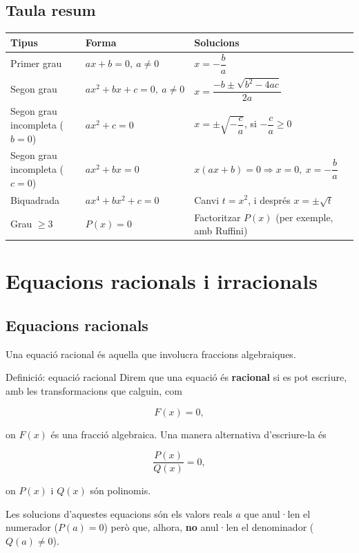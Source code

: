 \subsection{Taula resum}

\begin{center}
\begin{tabularx}{\linewidth}{lYY}
\toprule
\textbf{Tipus} & \textbf{Forma} & \textbf{Solucions} \\
\midrule
Primer grau & $ax+b=0,\ a\neq 0$ & $x=-\dfrac{b}{a}$ \\
Segon grau & $ax^2+bx+c=0,\ a\neq 0$ & $x=\dfrac{-b\pm\sqrt{b^2-4ac}}{2a}$ \\
Segon grau incompleta ($b=0$) & $ax^2+c=0$ & $x=\pm\sqrt{-\dfrac{c}{a}}$, si $-\dfrac{c}{a}\geq 0$ \\
Segon grau incompleta ($c=0$) & $ax^2+bx=0$ & $x(ax+b)=0 \Rightarrow x=0,\ x=-\dfrac{b}{a}$ \\
Biquadrada & $ax^4+bx^2+c=0$ & Canvi $t=x^2$, i després $x=\pm\sqrt{t}$ \\
Grau $\geq 3$ & $P(x)=0$ & Factoritzar $P(x)$ (per exemple, amb Ruffini) \\
\bottomrule
\end{tabularx}
\end{center}

\section{Equacions racionals i irracionals}

\subsection{Equacions racionals}

Una equació racional és aquella que involucra fraccions algebraiques.

\begin{definicio}{Definició: equació racional}
Direm que una equació és \textbf{racional} si es pot escriure, amb les transformacions que calguin, com

\[
F(x)=0,
\]

on $F(x)$ és una fracció algebraica. Una manera alternativa d'escriure-la és

\[
\frac{P(x)}{Q(x)} = 0,
\]

on $P(x)$ i $Q(x)$ són polinomis.
\end{definicio}

Les solucions d'aquestes equacions són els valors reals $a$ que anul·len el numerador ($P(a)=0$) però que, alhora, \textbf{no} anul·len el denominador ($Q(a) \neq 0$).

